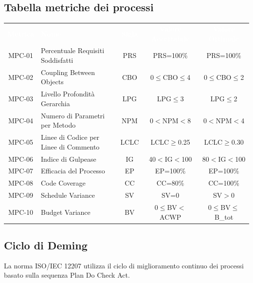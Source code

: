 \newpage
\subsection{Tabella metriche dei processi}
    \renewcommand{\arraystretch}{1.5}
    \begin{longtable}{ c C{4cm} c c c}
    \textcolor{white}{\textbf{Metrica}} & \textcolor{white}{\textbf{Nome}} & \textcolor{white}{\textbf{Sigla}} & \textcolor{white}{\textbf{Valore Accettabile}} & \textcolor{white}{\textbf{Valore Ottimale}}\\
    MPC-01 & Percentuale Requisiti Soddisfatti & PRS & PRS=100\% & PRS=100\% \\
    MPC-02 & Coupling Between Objects & CBO & 0$\leq$CBO$\leq$4 & 0$\leq$CBO$\leq$2 \\
    MPC-03 & Livello Profondità Gerarchia & LPG & LPG$\leq$3 & LPG$\leq$2\\
    MPC-04 & Numero di Parametri per Metodo & NPM & 0$<$NPM$<$8 & 0$<$NPM$<$4 \\
    MPC-05 & Linee di Codice per Linee di Commento & LCLC & LCLC$\geq$0.25 & LCLC$\geq$0.30 \\
    MPC-06 & Indice di Gulpease & IG & 40$<$IG$<$100 & 80$<$IG$<$100 \\
    MPC-07 & Efficacia del Processo & EP & EP=100\% & EP=100\%  \\
    MPC-08 & Code Coverage & CC & CC=80\% & CC=100\%  \\
    MPC-09 & Schedule Variance & SV & SV=0 & SV$>$0  \\	
    MPC-10 & Budget Variance & BV & 0$\leq$BV$<$ACWP  & 0$\leq$BV$\leq$B_tot  \\	

    \end{longtable}

\subsection{Ciclo di Deming}
    La norma ISO/IEC 12207 utilizza il ciclo di miglioramento continuo dei processi basato sulla sequenza Plan Do Check Act.

